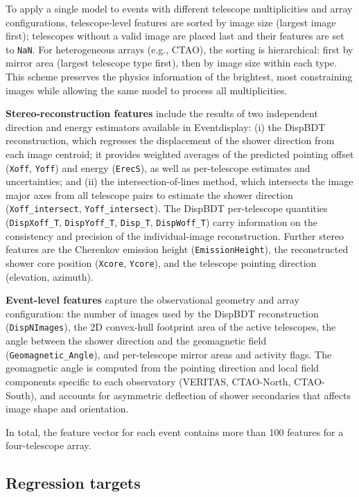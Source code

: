 \documentclass[12pt]{article}
\begin{document}
To apply a single model to events with different telescope multiplicities and
array configurations, telescope-level features are sorted by image size
(largest image first); telescopes without a valid image are placed last and
their features are set to \texttt{NaN}.
For heterogeneous arrays (e.g., CTAO), the sorting is hierarchical: first by
mirror area (largest telescope type first), then by image size within each type.
This scheme preserves the physics information of the brightest, most constraining
images while allowing the same model to process all multiplicities.

\textbf{Stereo-reconstruction features} include the results of two independent
direction and energy estimators available in Eventdisplay:
(i) the DispBDT reconstruction, which regresses the displacement of the shower
direction from each image centroid; it provides weighted averages of the
predicted pointing offset (\texttt{Xoff}, \texttt{Yoff}) and energy
(\texttt{ErecS}), as well as per-telescope estimates and uncertainties;
and (ii) the intersection-of-lines method, which intersects the image major axes
from all telescope pairs to estimate the shower direction (\texttt{Xoff\_intersect},
\texttt{Yoff\_intersect}).
The DispBDT per-telescope quantities (\texttt{DispXoff\_T}, \texttt{DispYoff\_T},
\texttt{Disp\_T}, \texttt{DispWoff\_T}) carry information on the consistency
and precision of the individual-image reconstruction.
Further stereo features are the Cherenkov emission height (\texttt{EmissionHeight}),
the reconstructed shower core position (\texttt{Xcore}, \texttt{Ycore}),
and the telescope pointing direction (elevation, azimuth).

\textbf{Event-level features} capture the observational geometry and array
configuration: the number of images used by the DispBDT reconstruction
(\texttt{DispNImages}), the 2D convex-hull footprint area of the active telescopes,
the angle between the shower direction and the geomagnetic field
(\texttt{Geomagnetic\_Angle}), and per-telescope mirror areas and activity flags.
The geomagnetic angle is computed from the pointing direction and local field
components specific to each observatory (VERITAS, CTAO-North, CTAO-South),
and accounts for asymmetric deflection of shower secondaries that affects
image shape and orientation.

In total, the feature vector for each event contains more than 100 features
for a four-telescope array.

\subsection{Regression targets}
\label{sec:targets}
\end{document}
